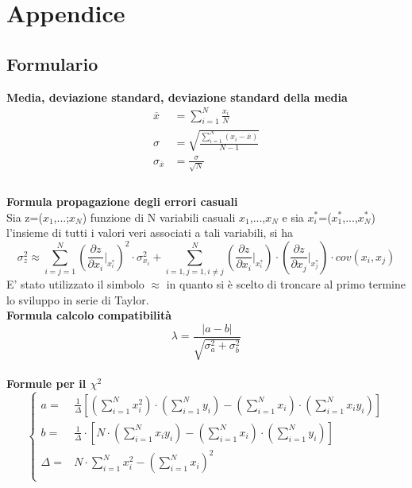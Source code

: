 \documentclass[a4paper,11pt,oneside]{article}
\begin{document}
\newpage
\section{Appendice}
\subsection{Formulario}
\textbf{Media, deviazione standard, deviazione standard della media}
\begin{equation*}
    \begin{aligned}
        \overline{x}&=\sum\limits_{i=1}^{N} \frac{x_{i}}{N}\\
        \sigma&=\sqrt{\frac{\sum\limits_{i=1}^{N} (x_{i}-\overline{x})}{N-1}}\\
        \sigma_{\overline{x}}&=\frac{\sigma}{\sqrt{N}}\\
    \end{aligned}
\end{equation*}\\

\textbf{Formula propagazione degli errori casuali}\\

Sia z=($x_1$,...;$x_N$) funzione di N variabili casuali $x_1$,...,$x_N$ e sia ${x_i^\ast}$=($x_1^\ast$,...,$x_N^{\ast}$) l'insieme di tutti i valori veri associati a tali variabili, si ha 
\begin{equation*}
    \sigma_z^{2}\approx  \sum_{i=j=1}^{N}\left ( \frac{\partial z}{\partial x_i}\Big|_{x_i^{\ast}} \right )^{2}\cdot\sigma_{x_i}^{2} +\sum_{i=1,j=1,i\neq j}^{N}\left (\frac{\partial z }{\partial x_i}\Big|_{x_i^{\ast}} \right ) \cdot \left ( \frac{\partial z}{\partial x_j} \Big|_{x_j^{\ast}} \right )\cdot cov(x_i,x_j)\label{eq:teorema_varianze}
\end{equation*}
E' stato utilizzato il simbolo $\approx$ in quanto si è scelto di troncare al primo termine lo sviluppo in serie di Taylor.\\


\textbf{Formula calcolo compatibilità}\\
\begin{equation*}
    \lambda=\frac{\left|a-b\right|}{\sqrt{\sigma^{2}_{a}+\sigma^{2}_{b}}}
\end{equation*}\\

\textbf{Formule per il ${\chi}^2$}
\begin{equation*}
        \begin{cases}
    a=&\frac{1}{\Delta}[(\sum\limits_{i=1}^{N}{x_{i}^{2}})\cdot(\sum\limits_{i=1}^{N}{y_{i}})-(\sum\limits_{i=1}^{N}{x_{i}})\cdot(\sum\limits_{i=1}^{N}{x_{i}y_{i}})] \\ 
    b=&\frac{1}{\Delta }\cdot \left [N\cdot \left ( \sum\limits_{i=1}^{N}x_i y_i \right )-\left ( \sum\limits_{i=1}^{N}x_i \right )\cdot \left ( \sum\limits_{i=1}^{N}y_i \right )  \right ]\\
    \Delta=& N\cdot \sum\limits_{i=1}^{N} x_i^{2} - \left ( \sum\limits_{i=1}^{N}x_i \right )^{2}\\

    \end{cases}
\end{equation*}
\end{document}
